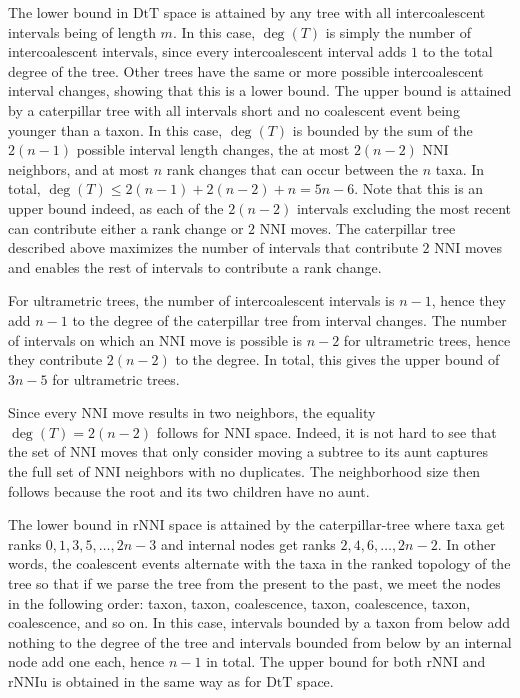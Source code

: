 \documentclass{amsart}
\theoremstyle{definition}
\newcommand{\nni}{\mathrm{NNI}}
\newcommand{\rnni}{\mathrm{rNNI}}
\newcommand{\rnniu}{\mathrm{rNNIu}}
\newcommand{\dtt}{\mathrm{DtT}}
\begin{document}
\proof
The lower bound in $\dtt$ space is attained by any tree with all intercoalescent intervals being of length $m$.
In this case, $\deg(T)$ is simply the number of intercoalescent intervals, since every intercoalescent interval adds $1$ to the total degree of the tree.
Other trees have the same or more possible intercoalescent interval changes, showing that this is a lower bound.
The upper bound is attained by a caterpillar tree with all intervals short and no coalescent event being younger than a taxon.
In this case, $\deg(T)$ is bounded by the sum of the $2(n-1)$ possible interval length changes, the at most $2(n-2)$ NNI neighbors, and at most $n$ rank changes that can occur between the $n$ taxa.
In total, $\deg(T) \le 2(n-1) + 2(n-2) + n = 5n-6$.
Note that this is an upper bound indeed, as each of the $2(n-2)$ intervals excluding the most recent can contribute either a rank change or $2$ NNI moves.
The caterpillar tree described above maximizes the number of intervals that contribute $2$ NNI moves and enables the rest of intervals to contribute a rank change.

For ultrametric trees, the number of intercoalescent intervals is $n-1$, hence they add $n-1$ to the degree of the caterpillar tree from interval changes.
The number of intervals on which an NNI move is possible is $n-2$ for ultrametric trees, hence they contribute $2(n-2)$ to the degree.
In total, this gives the upper bound of $3n-5$ for ultrametric trees.

Since every NNI move results in two neighbors, the equality $\deg(T) = 2(n-2)$ follows for $\nni$ space.
Indeed, it is not hard to see that the set of NNI moves that only consider moving a subtree to its aunt captures the full set of NNI neighbors with no duplicates.
The neighborhood size then follows because the root and its two children have no aunt.

The lower bound in $\rnni$ space is attained by the caterpillar-tree where taxa get ranks $0, 1, 3, 5, \ldots, 2n-3$ and internal nodes get ranks $2, 4, 6, \ldots, 2n-2$.
In other words, the coalescent events alternate with the taxa in the ranked topology of the tree so that if we parse the tree from the present to the past, we meet the nodes in the following order: taxon, taxon, coalescence, taxon, coalescence, taxon, coalescence, and so on.
In this case, intervals bounded by a taxon from below add nothing to the degree of the tree and intervals bounded from below by an internal node add one each, hence $n-1$ in total.
The upper bound for both $\rnni$ and $\rnniu$ is obtained in the same way as for $\dtt$ space.
\end{document}

